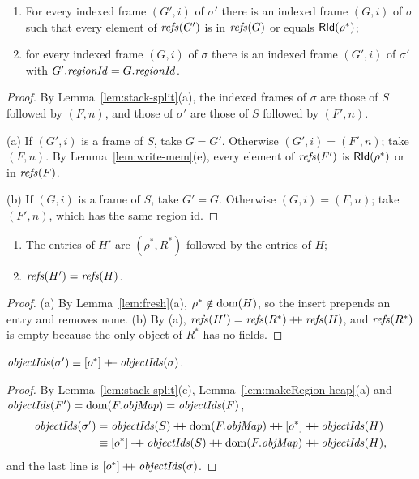 \begin{lemma}
\label{lem:makeRegion-frames}
\begin{enumerate}[nosep,label=(\alph*)]
  \item For every indexed frame $(G', i)$ of $\sigma'$ there is an indexed frame $(G, i)$ of $\sigma$
    such that every element of $\mathit{refs}(G')$ is in $\mathit{refs}(G)$ or equals $\mathsf{RId}(\rho^*)$;
  \item for every indexed frame $(G, i)$ of $\sigma$ there is an indexed frame $(G', i)$ of $\sigma'$
    with $G'.\mathit{regionId} = G.\mathit{regionId}$. 
\end{enumerate}
\end{lemma}
\begin{proof}
By Lemma~\ref{lem:stack-split}(a), the indexed frames of $\sigma$ are those of $S$ followed by
$(F, n)$, and those of $\sigma'$ are those of $S$ followed by $(F', n)$.

(a) If $(G', i)$ is a frame of $S$, take $G = G'$. Otherwise $(G', i) = (F', n)$; take $(F, n)$. By
Lemma~\ref{lem:write-mem}(e), every element of $\mathit{refs}(F')$ is $\mathsf{RId}(\rho^*)$ or in $\mathit{refs}(F)$.

(b) If $(G, i)$ is a frame of $S$, take $G' = G$. Otherwise $(G, i) = (F, n)$; take $(F', n)$, which
has the same region id.
\end{proof}

\begin{lemma}
\label{lem:makeRegion-heap}
\begin{enumerate}[nosep,label=(\alph*)]
  \item The entries of $H'$ are $(\rho^*, R^*)$ followed by the entries of $H$;
  \item $\mathit{refs}(H') = \mathit{refs}(H)$. 
\end{enumerate}
\end{lemma}
\begin{proof}
(a) By Lemma~\ref{lem:fresh}(a), $\rho^* \notin \mathrm{dom}(H)$, so the insert prepends an entry and removes
none. (b) By (a), $\mathit{refs}(H') = \mathit{refs}(R^*) \mathbin{+\!\!+} \mathit{refs}(H)$, and $\mathit{refs}(R^*)$ is empty because the only
object of $R^*$ has no fields.
\end{proof}

\begin{lemma}
\label{lem:makeRegion-oids}
$\mathit{objectIds}(\sigma') \equiv [o^*] \mathbin{+\!\!+} \mathit{objectIds}(\sigma)$.
\end{lemma}
\begin{proof}
By Lemma~\ref{lem:stack-split}(c), Lemma~\ref{lem:makeRegion-heap}(a) and
$\mathit{objectIds}(F') = \mathrm{dom}(F.\mathit{objMap}) = \mathit{objectIds}(F)$,
\begin{align*}
  \oids(\sigma') &= \oids(S) \cat \dom(F.\omap) \cat [o^*] \cat \oids(H) \\
    &\perm [o^*] \cat \oids(S) \cat \dom(F.\omap) \cat \oids(H),
\end{align*}
and the last line is $[o^*] \mathbin{+\!\!+} \mathit{objectIds}(\sigma)$.
\end{proof}

